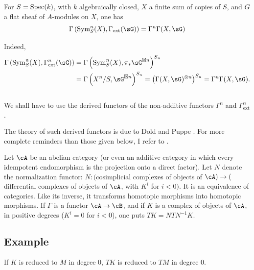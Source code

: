 \begin{lemma_}\label{III:1-3}
For $S=\operatorname{Spec}(k)$, with $k$ algebraically closed, $X$ a finite sum of
copies of $S$, and $G$ a flat sheaf of $A$-modules on $X$, one has
\[
  \Gamma\left(\operatorname{Sym}_S^n(X),\Gamma_\text{ext}(\sG)\right) = \Gamma^n \Gamma(X,\sG)
\]
\end{lemma_}

Indeed,
\begin{align*}
  \Gamma\left(\operatorname{Sym}_S^n(X),\Gamma_\text{ext}^n(\sG)\right)
    &= \Gamma\left(\operatorname{Sym}_S^n(X),\pi_*\sG^{\boxtimes n}\right)^{S_n} \\
    &= \Gamma\left(X^n/S,\sG^{\boxtimes n}\right)^{S_n}
    = \left(\Gamma(X,\sG)^{\otimes n}\right)^{S_n}
    = \Gamma^n \Gamma(X,\sG) \text{.}
\end{align*}




\subsection{}\label{III:1-4}

We shall have to use the derived functors of the non-additive functors $\Gamma^n$
and $\Gamma_\text{ext}^n$.

The theory of such derived functors is due to Dold and Puppe
\cite{do61}. For more complete reminders than those given below, I
refer to \cite[XVII 5.5.3]{sga4}.

Let $\cA$ be an abelian category (or even an additive category in which
every idempotent endomorphism is the projection onto a direct factor). Let
$N$ denote the normalization functor: $N:($cosimplicial complexes of objects of
$\cA)\to($differential complexes of objects of $\cA$, with $K^i$ for
$i<0)$. It is an equivalence of categories. Like its inverse, it
transforms homotopic morphisms into homotopic morphisms. If $\Gamma$ is a functor
$\cA\to\cB$, and if $K$ is a complex of objects of $\cA$, in positive
degrees ($K^i=0$ for $i<0$), one puts $T K=N T N^{-1} K$.




\subsection{Example}\label{III:1-5}

If $K$ is reduced to $M$ in degree $0$, $T K$ is reduced to $T M$ in
degree $0$.




\subsection{}\label{III:1-6}


